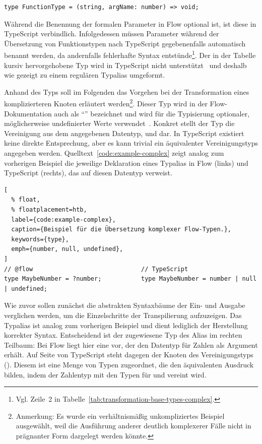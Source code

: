 \begin{lstlisting}[numbers=none]
type FunctionType = (string, argName: number) => void;
\end{lstlisting}

Während die Benennung der formalen Parameter in Flow optional ist, ist diese in TypeScript verbindlich. Infolgedessen müssen Parameter während der Übersetzung von Funktionstypen nach TypeScript gegebenenfalls automatisch benannt werden, da andernfalls fehlerhafte Syntax entstünde\footnote{Vgl. Zeile~2 in Tabelle~\ref{tab:transformation-base-types-complex}.}.
Der in der Tabelle kursiv hervorgehobene Typ  wird in TypeScript nicht unterstützt~\autocite{TS:GITHUB:NO_OPAQUE_TYPE} und deshalb wie gezeigt zu einem regulären Typalias umgeformt.



Anhand des Typs  soll im Folgenden das Vorgehen bei der Transformation eines komplizierteren Knoten erläutert werden\footnote{Anmerkung: Es wurde ein verhältnismäßig unkompliziertes Beispiel ausgewählt, weil die Ausführung anderer deutlich komplexerer Fälle nicht in prägnanter Form dargelegt werden könnte.}. Dieser Typ wird in der Flow-Dokumentation auch als \enquote{} bezeichnet und wird für die Typisierung optionaler, möglicherweise undefinierter Werte verwendet~\autocite{FLOW:MAYBE_TYPES}. Konkret stellt der Typ die Vereinigung aus dem angegebenen Datentyp,  und  dar. In TypeScript existiert keine direkte Entsprechung, aber es kann trivial ein äquivalenter Vereinigungstyps angegeben werden. Quelltext~\ref{code:example-complex} zeigt analog zum vorherigen Beispiel die jeweilige Deklaration eines Typalias in Flow (links) und TypeScript (rechts), das auf diesen Datentyp verweist.

\begin{lstlisting}[
  % float,
  % floatplacement=htb,
  label={code:example-complex},
  caption={Beispiel für die Übersetzung komplexer Flow-Typen.},
  keywords={type},
  emph={number, null, undefined},
]
// @flow                              // TypeScript
type MaybeNumber = ?number;           type MaybeNumber = number | null | undefined;
\end{lstlisting}

Wie zuvor sollen zunächst die abstrakten Syntaxbäume der Ein- und Ausgabe verglichen werden, um die Einzelschritte der Transpilierung aufzuzeigen. Das Typalias ist analog zum vorherigen Beispiel und dient lediglich der Herstellung korrekter Syntax. Entscheidend ist der zugewiesene Typ des Alias im rechten Teilbaum: Bei Flow liegt hier eine  vor, der den Datentyp für Zahlen als Argument erhält. Auf Seite von TypeScript steht dagegen der Knoten des Vereinigungstyps (). Diesem ist eine Menge von Typen zugeordnet, die den äquivalenten Ausdruck bilden, indem der Zahlentyp mit den Typen für  und  vereint wird.

